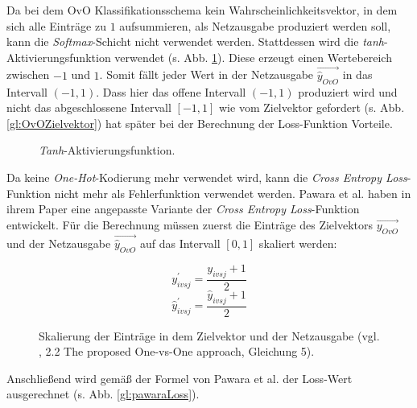 Da bei dem OvO Klassifikationsschema kein Wahrscheinlichkeitsvektor, in dem sich alle Einträge zu $1$ aufsummieren, als Netzausgabe produziert werden soll, kann die \textit{Softmax}-Schicht nicht verwendet werden. Stattdessen wird die \textit{tanh}-Aktivierungsfunktion verwendet (s. Abb. \ref{fig:tanh}). Diese erzeugt einen Wertebereich zwischen $-1$ und $1$. Somit fällt jeder Wert in der Netzausgabe $\overrightarrow{\widehat{y}_{OvO}}$ in das Intervall $(-1, 1)$. Dass hier das offene Intervall $(-1, 1)$ produziert wird und nicht das abgeschlossene Intervall $[-1, 1]$ wie vom Zielvektor gefordert (s. Abb. \ref{gl:OvOZielvektor}) hat später bei der Berechnung der Loss-Funktion Vorteile.

\begin{figure}[H]
\begin{adjustbox}{width=.65\textwidth, center}

\end{adjustbox}
\caption{\textit{Tanh}-Aktivierungsfunktion.}
\label{fig:tanh}
\end{figure}
Da keine \textit{One-Hot}-Kodierung mehr verwendet wird, kann die \textit{Cross Entropy Loss}-Funktion nicht mehr als Fehlerfunktion verwendet werden. Pawara et al. haben in ihrem Paper \cite{pawaraPaper} eine angepasste Variante der \textit{Cross Entropy Loss}-Funktion entwickelt. Für die Berechnung müssen zuerst die Einträge des Zielvektors $\overrightarrow{y_{OvO}}$ und der Netzausgabe $\overrightarrow{\widehat{y}_{OvO}}$ auf das Intervall $[0, 1]$ skaliert werden:
\begin{figure}[H]
\[y_{ivsj}^{'} = \frac{y_{ivsj} + 1}{2}\]
\[\widehat{y}_{ivsj}^{'} = \frac{\widehat{y}_{ivsj} + 1}{2}\]
\caption{Skalierung der Einträge in dem Zielvektor und der Netzausgabe (vgl. \cite{pawaraPaper}, 2.2 The proposed One-vs-One approach, Gleichung 5).}
\label{gl:pawaraSkalierung}
\end{figure}

Anschließend wird gemäß der Formel von Pawara et al. der Loss-Wert ausgerechnet (s. Abb. \ref{gl:pawaraLoss}).

